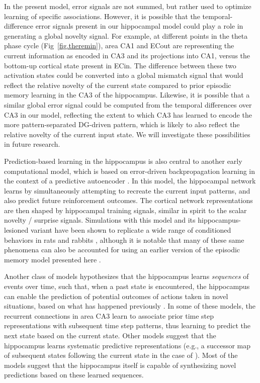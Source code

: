 \documentclass[11pt,twoside]{article}
\newif\myifpdf
\begin{document}
In the present model, error signals are not summed, but rather used to optimize learning of specific associations.  However, it is possible that the temporal-difference error signals present in our hippocampal model could play a role in generating a global novelty signal.  For example, at different points in the theta phase cycle (Fig~\ref{fig.theremin}), area CA1 and ECout are representing the current information as encoded in CA3 and its projections into CA1, versus the bottom-up cortical state present in ECin. The difference between these two activation states could be converted into a global mismatch signal that would reflect the relative novelty of the current state compared to prior episodic memory learning in the CA3 of the hippocampus.  Likewise, it is possible that a similar global error signal could be computed from the temporal differences over CA3 in our model, reflecting the extent to which CA3 has learned to encode the more pattern-separated DG-driven pattern, which is likely to also reflect the relative novelty of the current input state.  We will investigate these possibilities in future research. 

Prediction-based learning in the hippocampus is also central to another early computational model, which is based on error-driven backpropagation learning in the context of a predictive autoencoder \citep{MyersGluck95}.  In this model, the hippocampal network learns by simultaneously attempting to recreate the current input patterns, and also predict future reinforcement outcomes.  The cortical network representations are then shaped by hippocampal training signals, similar in spirit to the scalar novelty / surprise signals.  Simulations with this model and its hippocampus-lesioned variant have been shown to replicate a wide range of conditioned behaviors in rats and rabbits \citep{GluckMyers94}, although it is notable that many of these same phenomena can also be accounted for using an earlier version of the episodic memory model presented here \citep{OReillyRudy01}. 

Another class of models hypothesizes that the hippocampus learns \emph{sequences} of events over time, such that, when a past state is encountered, the hippocampus can enable the prediction of potential outcomes of actions taken in novel situations, based on what has happened previously \citep{Levy96,WallensteinHasselmo97,JensenLisman96,TsodyksSkaggsSejnowskiEtAl96,Rolls13,SchapiroTurk-BrowneBotvinickEtAl17,StachenfeldBotvinickGershman17}. In some of these models, the recurrent connections in area CA3 learn to associate prior time step representations with subsequent time step patterns, thus learning to predict the next state based on the current state.  Other models suggest that the hippocampus learns systematic predictive representations (e.g., a successor map of subsequent states following the current state in the case of \citealp{StachenfeldBotvinickGershman17}).  Most of the models suggest that the hippocampus itself is capable of synthesizing novel predictions based on these learned sequences. 
\end{document}
